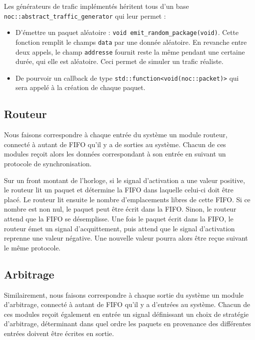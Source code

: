 \documentclass[11pt]{article}
\begin{document}
\vspace{0.5cm}

Les générateurs de trafic implémentés héritent tous d'un base
\texttt{noc::abstract\_traffic\_generator} qui leur permet :
\begin{itemize}
  \item D'émettre un paquet aléatoire : \texttt{void
    emit\_random\_package(void)}. Cette fonction remplit le champs \texttt{data}
    par une donnée aléatoire. En revanche entre deux appels, le champ
    \texttt{addresse} fournit reste la même pendant une certaine durée, qui elle
    est aléatoire. Ceci permet de simuler un trafic réaliste.
  \item De pourvoir un callback de type
    \texttt{std::function<void(noc::packet)>} qui sera appelé à la création de
    chaque paquet.
\end{itemize}


\subsection{Routeur}
Nous faisons correspondre à chaque entrée du système un module routeur, connecté à autant de FIFO qu'il y a de sorties au système.
Chacun de ces modules reçoit alors les données correspondant à son entrée en suivant un protocole de synchronisation.

Sur un front montant de l'horloge, si le signal d'activation a une valeur positive,
le routeur lit un paquet et détermine la FIFO dans laquelle celui-ci doit être placé.
Le routeur lit ensuite le nombre d'emplacements libres de cette FIFO.
Si ce nombre est non nul, le paquet peut être écrit dans la FIFO.
Sinon, le routeur attend que la FIFO se désemplisse.
Une fois le paquet écrit dans la FIFO, le routeur émet un signal d'acquittement,
puis attend que le signal d'activation reprenne une valeur négative.
Une nouvelle valeur pourra alors être reçue suivant le même protocole.

\subsection{Arbitrage}
Similairement, nous faisons correspondre à chaque sortie du système un module d'arbitrage, connecté à autant de FIFO qu'il y a d'entrées au système.
Chacun de ces modules reçoit également en entrée un signal définissant un choix de stratégie d'arbitrage, déterminant dans quel ordre les paquets en provenance des différentes entrées doivent être écrites en sortie.
\end{document}
